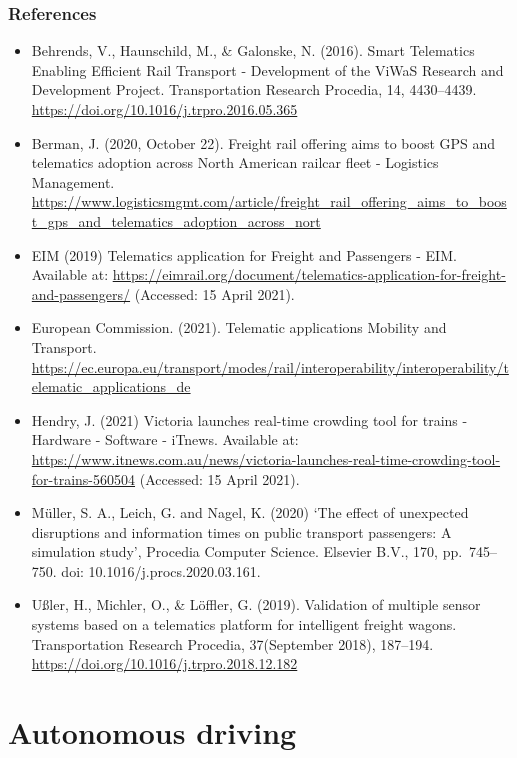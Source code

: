 \documentclass[
]{book}
\providecommand{\tightlist}{%
  \setlength{\itemsep}{0pt}\setlength{\parskip}{0pt}}
\begin{document}
\hypertarget{references-21}{%
\subsection*{References}\label{references-21}}

\begin{itemize}
\tightlist
\item
  Behrends, V., Haunschild, M., \& Galonske, N. (2016). Smart Telematics Enabling Efficient Rail Transport - Development of the ViWaS Research and Development Project. Transportation Research Procedia, 14, 4430--4439. \url{https://doi.org/10.1016/j.trpro.2016.05.365}
\item
  Berman, J. (2020, October 22). Freight rail offering aims to boost GPS and telematics adoption across North American railcar fleet - Logistics Management. \url{https://www.logisticsmgmt.com/article/freight_rail_offering_aims_to_boost_gps_and_telematics_adoption_across_nort}
\item
  EIM (2019) Telematics application for Freight and Passengers - EIM. Available at: \url{https://eimrail.org/document/telematics-application-for-freight-and-passengers/} (Accessed: 15 April 2021).
\item
  European Commission. (2021). Telematic applications \textbar{} Mobility and Transport. \url{https://ec.europa.eu/transport/modes/rail/interoperability/interoperability/telematic_applications_de}
\item
  Hendry, J. (2021) Victoria launches real-time crowding tool for trains - Hardware - Software - iTnews. Available at: \url{https://www.itnews.com.au/news/victoria-launches-real-time-crowding-tool-for-trains-560504} (Accessed: 15 April 2021).
\item
  Müller, S. A., Leich, G. and Nagel, K. (2020) `The effect of unexpected disruptions and information times on public transport passengers: A simulation study', Procedia Computer Science. Elsevier B.V., 170, pp.~745--750. doi: 10.1016/j.procs.2020.03.161.
\item
  Ußler, H., Michler, O., \& Löffler, G. (2019). Validation of multiple sensor systems based on a telematics platform for intelligent freight wagons. Transportation Research Procedia, 37(September 2018), 187--194. \url{https://doi.org/10.1016/j.trpro.2018.12.182}
\end{itemize}

\hypertarget{connected}{%
\chapter{Autonomous driving}\label{connected}}
\end{document}
